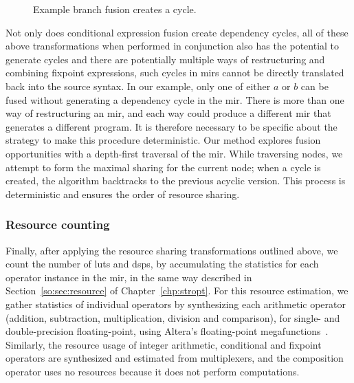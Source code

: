 \begin{figure}[ht]
{\label{po:fig:mir_cond_fusion_4}
    }
    \caption{Example branch fusion creates a cycle.}
\end{figure}

Not only does conditional expression fusion create dependency cycles, all
of these above transformations when performed in conjunction also has the
potential to generate cycles and there are potentially multiple ways of
restructuring and combining fixpoint expressions, such cycles in \glspl{mir}
cannot be directly translated back into the source syntax.  In our example,
only one of either $a$ or $b$ can be fused without generating a dependency
cycle in the \gls{mir}\@.  There is more than one way of restructuring an
\gls{mir}, and each way could produce a different \gls{mir} that generates a
different program.  It is therefore necessary to be specific about the strategy
to make this procedure deterministic.  Our method explores fusion opportunities
with a depth-first traversal of the \gls{mir}\@.  While traversing nodes,
we attempt to form the maximal sharing for the current node; when a cycle
is created, the algorithm backtracks to the previous acyclic version.  This
process is deterministic and ensures the order of resource sharing.


\subsubsection{Resource counting}

Finally, after applying the resource sharing transformations outlined above, we
count the number of \glspl{lut} and \glspl{dsp}, by accumulating the statistics
for each operator instance in the \gls{mir}, in the same way described in
Section~\ref{so:sec:resource} of Chapter~\ref{chp:stropt}.  For this resource
estimation, we gather statistics of individual operators by synthesizing each
arithmetic operator (addition, subtraction, multiplication, division and
comparison), for single- and double-precision floating-point, using Altera's
floating-point megafunctions~\cite{altfp}.  Similarly, the resource usage of
integer arithmetic, conditional and fixpoint operators are synthesized and
estimated from multiplexers, and the composition operator uses no resources
because it does not perform computations.
